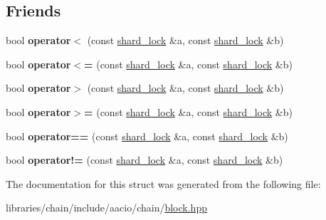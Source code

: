 \subsection*{Friends}
\begin{DoxyCompactItemize}
\item 
\mbox{\label{structaacio_1_1chain_1_1shard__lock_a73f77a0566ed2ff3e0228d732c4a6c8b}} 
bool {\bfseries operator$<$} (const \mbox{\hyperlink{structaacio_1_1chain_1_1shard__lock}{shard\+\_\+lock}} \&a, const \mbox{\hyperlink{structaacio_1_1chain_1_1shard__lock}{shard\+\_\+lock}} \&b)
\item 
\mbox{\label{structaacio_1_1chain_1_1shard__lock_ab0f417bd02e494346d48f96db7839397}} 
bool {\bfseries operator$<$=} (const \mbox{\hyperlink{structaacio_1_1chain_1_1shard__lock}{shard\+\_\+lock}} \&a, const \mbox{\hyperlink{structaacio_1_1chain_1_1shard__lock}{shard\+\_\+lock}} \&b)
\item 
\mbox{\label{structaacio_1_1chain_1_1shard__lock_a7712597097df62a66fc140edfee07a12}} 
bool {\bfseries operator$>$} (const \mbox{\hyperlink{structaacio_1_1chain_1_1shard__lock}{shard\+\_\+lock}} \&a, const \mbox{\hyperlink{structaacio_1_1chain_1_1shard__lock}{shard\+\_\+lock}} \&b)
\item 
\mbox{\label{structaacio_1_1chain_1_1shard__lock_ae9a9c125316d7bd85a7d83d19fecda1a}} 
bool {\bfseries operator$>$=} (const \mbox{\hyperlink{structaacio_1_1chain_1_1shard__lock}{shard\+\_\+lock}} \&a, const \mbox{\hyperlink{structaacio_1_1chain_1_1shard__lock}{shard\+\_\+lock}} \&b)
\item 
\mbox{\label{structaacio_1_1chain_1_1shard__lock_a8adcc6239a1b5abd7a9ec60721f5308b}} 
bool {\bfseries operator==} (const \mbox{\hyperlink{structaacio_1_1chain_1_1shard__lock}{shard\+\_\+lock}} \&a, const \mbox{\hyperlink{structaacio_1_1chain_1_1shard__lock}{shard\+\_\+lock}} \&b)
\item 
\mbox{\label{structaacio_1_1chain_1_1shard__lock_ad525c13d420a6979d5fc70b257fa4f5c}} 
bool {\bfseries operator!=} (const \mbox{\hyperlink{structaacio_1_1chain_1_1shard__lock}{shard\+\_\+lock}} \&a, const \mbox{\hyperlink{structaacio_1_1chain_1_1shard__lock}{shard\+\_\+lock}} \&b)
\end{DoxyCompactItemize}


The documentation for this struct was generated from the following file\+:\begin{DoxyCompactItemize}
\item 
libraries/chain/include/aacio/chain/\mbox{\hyperlink{block_8hpp}{block.\+hpp}}\end{DoxyCompactItemize}
